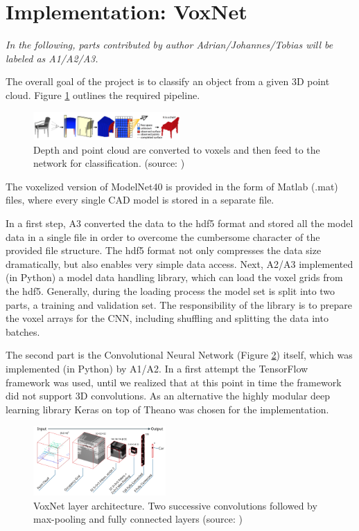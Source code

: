\documentclass[10pt,twocolumn,letterpaper]{article}
\begin{document}
\section{Implementation: VoxNet \cite{voxnet}}

\textit{In the following, parts contributed by author Adrian/Johannes/Tobias will be labeled 
as A1/A2/A3.}\newline

The overall goal of the project is to classify an object from a given 3D point cloud. Figure \ref{fig:algo} outlines 
the required pipeline.

\begin{figure}[h]
	\centering
	\includegraphics[width=0.5\textwidth]{figures/algo}
	\caption{ Depth and point cloud are converted to voxels and then feed to the network 
	for classification. (source: \cite{shape})}
	\label{fig:algo}
\end{figure}

The voxelized version of ModelNet40 is provided in the form of Matlab (.mat) files, where every single CAD model is stored 
in a separate file.

In a first step, A3 converted the data to the hdf5 format and stored all the model data in a single file in order to overcome 
the cumbersome character of the provided file structure. The hdf5 format not only compresses the data size dramatically, but also enables
very simple data access. 
Next, A2/A3 implemented (in Python) a model data handling library, which can load the voxel grids from the hdf5. Generally, during the loading 
process the model set is split into two parts, a training and validation set. The responsibility of the library is to prepare 
the voxel arrays for the CNN, including shuffling and splitting the data into batches.

The second part is the Convolutional Neural Network (Figure \ref{fig:voxnet_structure}) itself, which was implemented (in Python) by A1/A2.
In a first attempt the TensorFlow framework was used, until we realized that at this point in time the framework 
did not support 3D convolutions. As an alternative the highly modular deep learning library Keras on top of Theano
was chosen for the implementation.

\begin{figure}[h]
	\centering
	\includegraphics[width=0.45\textwidth]{figures/model}
	\caption{VoxNet layer architecture. Two successive convolutions followed by 
	max-pooling and fully connected layers (source: \cite{mature})}
	\label{fig:voxnet_structure}
\end{figure}
\end{document}
